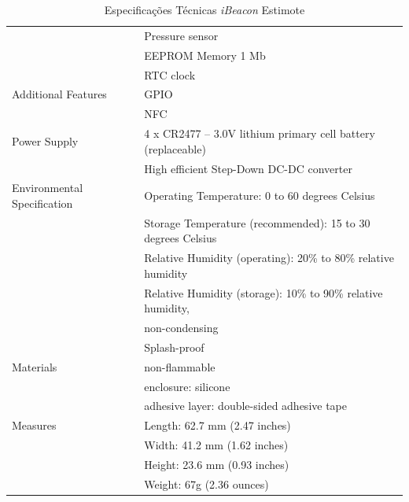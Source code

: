 \documentclass[
	12pt,				%
	openright,			%
	twoside,			%
	a4paper,			%
	english,			%
	french,				%
	spanish,			%
	brazil				%
	]{abntex2}
\begin{document}
\begin{table}[h!]
\begin{tabular}{ | l | l | }
                                        & Pressure sensor \\
                                        & EEPROM Memory 1 Mb \\
                                        & RTC clock \\
        \hline
        Additional Features             & GPIO \\
                                        & NFC \\
        \hline
        Power Supply                    & 4 x CR2477 – 3.0V lithium primary cell battery (replaceable) \\
                                        & High efficient Step-Down DC-DC converter \\
        \hline
        Environmental Specification     & Operating Temperature: 0 to 60 degrees Celsius \\
                                        & Storage Temperature (recommended): 15 to 30 degrees Celsius \\
                                        & Relative Humidity (operating): 20\% to 80\% relative humidity \\
                                        & Relative Humidity (storage): 10\% to 90\% relative humidity, \\
                                        & non-condensing \\
                                        & Splash-proof \\
        \hline
        Materials                       & non-ﬂammable \\
                                        & enclosure: silicone \\
                                        & adhesive layer: double-sided adhesive tape \\
        \hline
        Measures                        & Length: 62.7 mm (2.47 inches) \\
                                        & Width: 41.2 mm (1.62 inches) \\
                                        & Height: 23.6 mm (0.93 inches) \\
                                        & Weight: 67g (2.36 ounces) \\
        \hline
    \end{tabular}
    \caption{Especificações Técnicas \textit{iBeacon} Estimote}
    \label{table:ibeacon}
\end{table}
\end{document}
